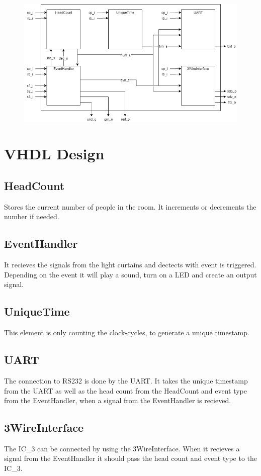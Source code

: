 \documentclass[12pt,a4 paper] {report}
\begin{document}
\begin{figure}[h]
	\centering	
	\includegraphics[scale=0.6]{../png/top.png}
\end{figure}

\chapter{VHDL Design}
\section*{HeadCount}
Stores the current number of people in the room. It increments or decrements the number if needed.
\section*{EventHandler}
It recieves the signals from the light curtains and dectects with event is triggered. Depending on the event it will play a sound, turn on a LED and create an output signal.
\section*{UniqueTime}
This element is only counting the clock-cycles, to generate a unique timestamp. \newpage
\section*{UART}
The connection to RS232 is done by the UART. It takes the unique timestamp from the UART as well as the head count from the HeadCount and event type from the EventHandler, when a signal from the EventHandler is recieved.
\section*{3WireInterface}
The IC\_3 can be connected by using the 3WireInterface. When it recieves a signal from the EventHandler it should pass the head count and event type to the IC\_3.
\end{document}
